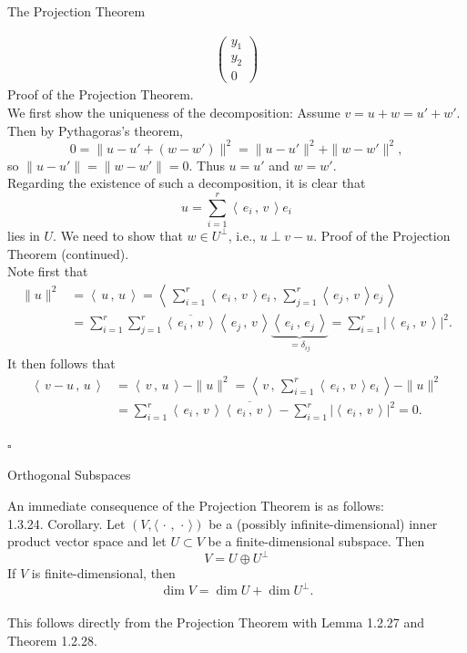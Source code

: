 \documentclass[smaller,hyperref={CJKbookmarks=true}]{beamer}
\newcommand{\scp}[2]{\left\langle\,#1\,,\,#2\,\right\rangle} \newcommand{\scpp}{\langle\,\cdot\,,\,\cdot\,\rangle}
\begin{document}
\begin{frame}{The Projection Theorem}
\begin{spacing}{1}
\begin{align*}
\begin{pmatrix}
                                         y_1 \\
                                         y_2 \\
                                         0
                                       \end{pmatrix}
\end{align*}
\newpage
\alert{Proof of the Projection Theorem.}\\[11pt]
We first show the uniqueness of the decomposition: Assume $v=u+w=u'+w'$. Then by Pythagoras's theorem,
\begin{equation*}
  0=\|u-u'+(w-w')\|^2=\|u-u'\|^2+\|w-w'\|^2,
\end{equation*}
so $\|u-u'\|=\|w-w'\|=0$. Thus $u=u'$ and $w=w'$.\\[11pt]
Regarding the existence of such a decomposition, it is clear that
\[u=\sum_{i=1}^{r}\scp{e_i}{v}e_i\]
lies in $U$. We need to show that $w\in U^{\perp}$, i.e., $u\perp v-u$.
\newpage
\alert{Proof of the Projection Theorem (continued).}\\
Note first that
\begin{align*}
  \|u\|^2 &=\scp{u}{u}=\scp{\sum_{i=1}^{r}\scp{e_i}{v}e_i}{\sum_{j=1}^{r}\scp{e_j}{v}e_j}  \\
   &=\sum_{i=1}^{r}\sum_{j=1}^{r}\overline{\scp{e_i}{v}}\scp{e_j}{v}\underbrace{\scp{e_i}{e_j}}_{=\delta_{ij}}=\sum_{i=1}^{r}|\scp{e_i}{v}|^2.
\end{align*}
It then follows that
\begin{align*}
  \scp{v-u}{u} &=\scp{v}{u}-\|u\|^2=\scp{v}{\sum_{i=1}^{r}\scp{e_i}{v}e_i}-\|u\|^2  \\
   &=\sum_{i=1}^{r}\scp{e_i}{v}\overline{\scp{e_i}{v}}-\sum_{i=1}^{r}|\scp{e_i}{v}|^2=0.
\end{align*}
\begin{flushright}
  $\square$
\end{flushright}
\end{spacing}
\end{frame}
\begin{frame}[c,shrink]{Orthogonal Subspaces}
\begin{spacing}{1}
An immediate consequence of the Projection Theorem is as follows:\\[12pt]
\alert{1.3.24. Corollary.} Let $(V,\scpp)$ be a (possibly infinite-dimensional) inner product vector space and let $U\subset V$ be a finite-dimensional subspace. Then
\[V=U\oplus U^{\perp}\]
If $V$ is finite-dimensional, then
\[\dim V=\dim U+\dim U^{\perp}.\]
 \\[14pt]
This follows directly from the Projection Theorem with Lemma 1.2.27 and
Theorem 1.2.28.
\end{spacing}
\end{frame}
\end{document}
